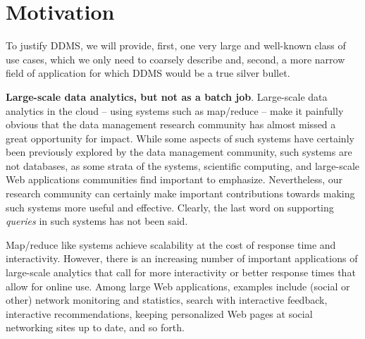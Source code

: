 





\section{Motivation}


To justify DDMS, we will provide, first, one very large and well-known class of use cases, which we only need to coarsely describe and,
second, a more narrow field of application for which DDMS would be a true silver bullet. 


\medskip


{\bf Large-scale data analytics, but not as a batch job}\/.
%
Large-scale data analytics in the cloud -- using systems such as map/reduce -- make it painfully obvious that the data management research community has almost missed a great opportunity for impact.
While some aspects of such systems have certainly been previously explored by the data management community, such systems are not databases, as some strata of the systems, scientific computing, and large-scale Web applications communities find important to emphasize. Nevertheless, our research community can certainly make important contributions towards making such systems more useful and effective. Clearly, the last word on supporting {\em queries}\/ in such systems has not been said.

Map/reduce like systems achieve scalability at the cost of response time and interactivity.
%
%
However, there is an increasing number of important applications of large-scale analytics that call for more interactivity or better response times that allow for online use. Among large Web applications, examples include (social or other) network monitoring and statistics, search with interactive feedback, interactive recommendations, keeping personalized Web pages at social networking sites up to date, and so forth.
%

